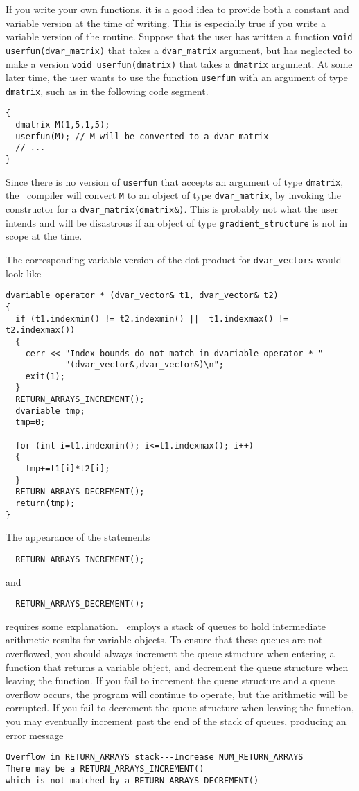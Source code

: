 \documentclass{admbmanual}
\begin{document}
If you write your own functions, it is a good idea to provide both a constant
and variable version at the time of writing. This is especially true if you
write a variable version of the routine. Suppose that the user has written a
function \texttt{void userfun(dvar\_matrix)} that takes a \texttt{dvar\_matrix}
argument, but has neglected to make a version \texttt{void userfun(dmatrix)}
that takes a \texttt{dmatrix} argument. At some later time, the user wants to
use the function \texttt{userfun} with an argument of type \texttt{dmatrix},
such as in the following code segment.
\begin{lstlisting}
{
  dmatrix M(1,5,1,5);
  userfun(M); // M will be converted to a dvar_matrix
  // ...
}
\end{lstlisting}
Since there is no version of \texttt{userfun} that accepts an argument of type
\texttt{dmatrix}, the \cplus\ compiler will convert \texttt{M} to an object of
type \texttt{dvar\_matrix}, by invoking the constructor for a
\texttt{dvar\_matrix(dmatrix\&)}. This is probably not what the user intends and
will be disastrous if an object of type \texttt{gradient\_structure} is not in
scope at the time.

The corresponding variable version of the dot product for \texttt{dvar\_vectors}
would look like
\begin{lstlisting}
dvariable operator * (dvar_vector& t1, dvar_vector& t2)
{
  if (t1.indexmin() != t2.indexmin() ||  t1.indexmax() != t2.indexmax())
  {
    cerr << "Index bounds do not match in dvariable operator * "
            "(dvar_vector&,dvar_vector&)\n";
    exit(1);
  }
  RETURN_ARRAYS_INCREMENT();
  dvariable tmp;
  tmp=0;

  for (int i=t1.indexmin(); i<=t1.indexmax(); i++)
  {
    tmp+=t1[i]*t2[i];
  }
  RETURN_ARRAYS_DECREMENT();
  return(tmp);
}
\end{lstlisting}

The appearance of the statements
\begin{lstlisting}
  RETURN_ARRAYS_INCREMENT();
\end{lstlisting}
and
\begin{lstlisting}
  RETURN_ARRAYS_DECREMENT();
\end{lstlisting}
requires some explanation. \scAD\ employs a stack of queues to hold intermediate
arithmetic results for variable objects. To ensure that these queues are not
overflowed, you should always increment the queue structure when entering a
function that returns a variable object, and decrement the queue structure when
leaving the function. If you fail to increment the queue structure and a queue
overflow occurs, the program will continue to operate, but the arithmetic will
be corrupted. If you fail to decrement the queue structure when leaving the
function, you may eventually increment past the end of the stack of queues,
producing an error message
\begin{lstlisting}
Overflow in RETURN_ARRAYS stack---Increase NUM_RETURN_ARRAYS
There may be a RETURN_ARRAYS_INCREMENT()
which is not matched by a RETURN_ARRAYS_DECREMENT()
\end{lstlisting}
\end{document}
